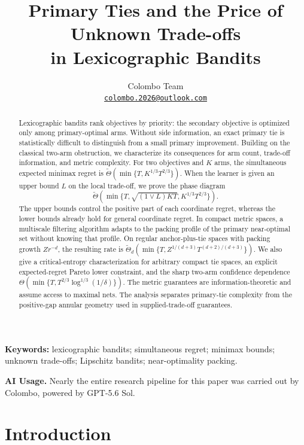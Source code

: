 \documentclass[11pt]{article}
\title{Primary Ties and the Price of Unknown Trade-offs\\
       in Lexicographic Bandits}
\author{Colombo Team\\[0.2em]
  \normalsize\href{mailto:colombo.2026@outlook.com}{\texttt{colombo.2026@outlook.com}}}
\date{}
\theoremstyle{definition}
\begin{document}
\maketitle

\begin{abstract}
Lexicographic bandits rank objectives by priority: the secondary objective
is optimized only among primary-optimal arms. Without side information,
an exact primary tie is statistically difficult to distinguish from a small
primary improvement. Building on the classical two-arm obstruction, we
characterize its consequences for arm count, trade-off information, and
metric complexity. For two objectives and $K$ arms, the simultaneous
expected minimax regret is
$\widetilde\Theta(\min\{T,K^{1/3}T^{2/3}\})$.
When the learner is given an upper bound $L$ on the local trade-off,
we prove the phase diagram
\[
  \widetilde\Theta\!\left(
  \min\{T,\sqrt{(1\vee L)KT},K^{1/3}T^{2/3}\}\right).
\]
The upper bounds control the positive part of each coordinate regret,
whereas the lower bounds already hold for general coordinate regret.
In compact metric spaces, a multiscale filtering algorithm adapts to the
packing profile of the primary near-optimal set without knowing that
profile. On regular anchor-plus-tie spaces with packing growth $Zr^{-d}$,
the resulting rate is
$\widetilde\Theta_d(\min\{T,Z^{1/(d+3)}T^{(d+2)/(d+3)}\})$.
We also give a critical-entropy characterization for arbitrary compact tie
spaces, an explicit expected-regret Pareto lower constraint, and the sharp
two-arm confidence dependence
$\Theta(\min\{T,T^{2/3}\log^{1/3}(1/\delta)\})$.
The metric guarantees are information-theoretic and assume access to
maximal nets. The analysis separates primary-tie complexity from the
positive-gap annular geometry used in supplied-trade-off guarantees.
\end{abstract}

\medskip
\noindent\textbf{Keywords:} lexicographic bandits; simultaneous regret;
minimax bounds; unknown trade-offs; Lipschitz bandits; near-optimality packing.
\par\smallskip
\begin{samepage}
\noindent\textbf{AI Usage.}
Nearly the entire research pipeline for this paper was carried out by
Colombo, powered by GPT-5.6 Sol.
\par
\end{samepage}

\section{Introduction}
\label{sec:introduction}
\end{document}
